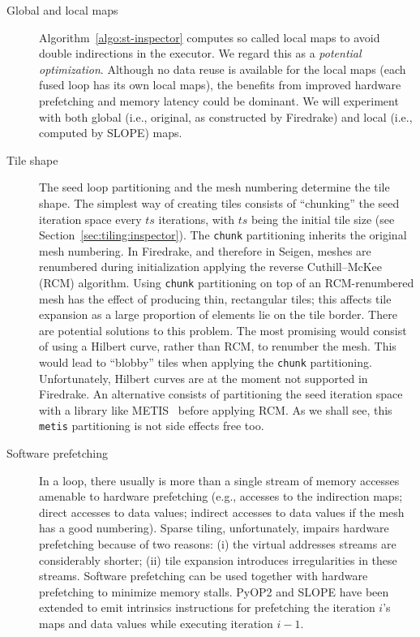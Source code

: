 \begin{description}
\item[Global and local maps] Algorithm~\ref{algo:st-inspector} computes so called local maps to avoid double indirections in the executor. We regard this as a {\it potential optimization}. Although no data reuse is available for the local maps (each fused loop has its own local maps), the benefits from improved hardware prefetching and memory latency could be dominant. We will experiment with both global (i.e., original, as constructed by Firedrake) and local (i.e., computed by SLOPE) maps. 

\item[Tile shape] The seed loop partitioning and the mesh numbering determine the tile shape. The simplest way of creating tiles consists of ``chunking'' the seed iteration space every $ts$ iterations, with $ts$ being the initial tile size (see Section~\ref{sec:tiling:inspector}). The {\tt chunk} partitioning inherits the original mesh numbering. In Firedrake, and therefore in Seigen, meshes are renumbered during initialization applying the reverse Cuthill–McKee (RCM) algorithm. Using {\tt chunk} partitioning on top of an RCM-renumbered mesh has the effect of producing thin, rectangular tiles; this affects tile expansion as a large proportion of elements lie on the tile border. There are potential solutions to this problem. The most promising would consist of using a Hilbert curve, rather than RCM, to renumber the mesh. This would lead to ``blobby'' tiles when applying the {\tt chunk} partitioning. Unfortunately, Hilbert curves are at the moment not supported in Firedrake. An alternative consists of partitioning the seed iteration space with a library like METIS~\citep{METIS} before applying RCM. As we shall see, this {\tt metis} partitioning is not side effects free too.

\item[Software prefetching] In a loop, there usually is more than a single stream of memory accesses amenable to hardware prefetching (e.g., accesses to the indirection maps; direct accesses to data values; indirect accesses to data values if the mesh has a good numbering). Sparse tiling, unfortunately, impairs hardware prefetching because of two reasons: (i) the virtual addresses streams are considerably shorter; (ii) tile expansion introduces irregularities in these streams. Software prefetching can be used together with hardware prefetching to minimize memory stalls. PyOP2 and SLOPE have been extended to emit intrinsics instructions for prefetching the iteration $i$'s maps and data values while executing iteration $i-1$. 


\end{description}
